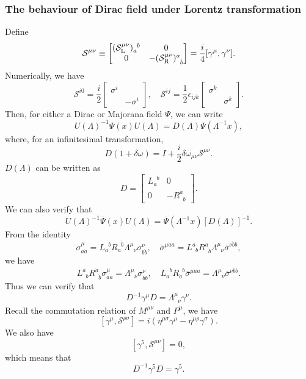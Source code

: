 \subsubsection{The behaviour of Dirac field under Lorentz transformation}
\noindent
Define
\[\mathcal{S}^{\mu \nu} \equiv \left[ \begin{matrix} (\mathcal{S}_{\rm L}^{\mu\nu})_a^{\phantom{a}b}& 0\\ 0& -(\mathcal{S}_{\rm R}^{\mu\nu})^{\dot{a}}_{\phantom{\dot{a}} \dot{b}}\end{matrix} \right] = \frac{i}{4}[\gamma^{\mu},\gamma^{\nu}] .\]
Numerically, we have
\[\mathcal{S}^{i0} = \frac{i}{2} \left[ \begin{matrix} \sigma ^{i}& \\ & -\sigma ^{i}\end{matrix} \right] , \quad \mathcal{S}^{ij} = \frac{1}{2} \epsilon_{ijk} \left[ \begin{matrix} \sigma ^{k}& \\ & \sigma ^{k}\end{matrix} \right] .\]
Then, for either a Dirac or Majorana field $\Psi$, we can write
\[U(\Lambda)^{-1} \Psi(x) U(\Lambda) = D(\Lambda) \Psi(\Lambda^{-1}x),\]
where, for an infinitesimal transformation,
\[D(1+\delta \omega) = I + \frac{i}{2} \delta \omega_{\mu \nu} \mathcal{S}^{\mu \nu}.\]
$D(\Lambda)$ can be written as
\[D = \left[ \begin{matrix} L_a^{\phantom{a}b}& 0\\ 0& -R^{\dot{a}}_{\phantom{\dot{a}} \dot{b}}\end{matrix} \right]  .\]
We can also verify that
\[U(\Lambda)^{-1} \overline{\Psi}(x) U(\Lambda) = \overline{\Psi}(\Lambda^{-1}x)[D(\Lambda)]^{-1} .\]
From the identity
\[\sigma^{\mu}_{a\dot{a}} = L_a^{\phantom{a}b} R_{\dot{a}}^{\phantom{\dot{a}} \dot{b}} \Lambda^{\mu}_{\phantom{\mu} \nu} \sigma^{\nu}_{b\dot{b}} , \quad \overline{\sigma}^{\mu \dot{a} a} = L^a_{\phantom{a}b} R^{\dot{a}}_{\phantom{\dot{a}} \dot{b}} \Lambda^{\mu}_{\phantom{\mu} \nu} \overline{\sigma}^{\nu\dot{b}b},\]
we have
\[L^a_{\phantom{a}b} R^{\dot{a}}_{\phantom{\dot{a}} \dot{b}} \sigma^{\mu}_{a\dot{a}} =  \Lambda^{\mu}_{\phantom{\mu} \nu} \sigma^{\nu}_{b\dot{b}} , \quad L_a^{\phantom{a}b} R_{\dot{a}}^{\phantom{\dot{a}} \dot{b}} \overline{\sigma}^{\mu \dot{a} a} =  \Lambda^{\mu}_{\phantom{\mu} \nu} \overline{\sigma}^{\nu\dot{b}b}.\]
Thus we can verify that
\[D^{-1} \gamma^{\mu} D = \Lambda^{\mu}_{\phantom{\mu} \nu} \gamma^{\nu}.\]
Recall the commutation relation of $M^{\mu \nu}$ and $P^{\mu}$, we have
\[[\gamma^{\mu},\mathcal{S}^{\rho \sigma}] = i(\eta^{\mu \sigma}\gamma^{\mu} - \eta^{\mu \rho}\gamma^{\sigma}).\]
We also have
\[[\gamma^5,\mathcal{S}^{\mu \nu}] = 0,\]
which means that
\[D^{-1} \gamma^{5} D =  \gamma^{5}.\]

